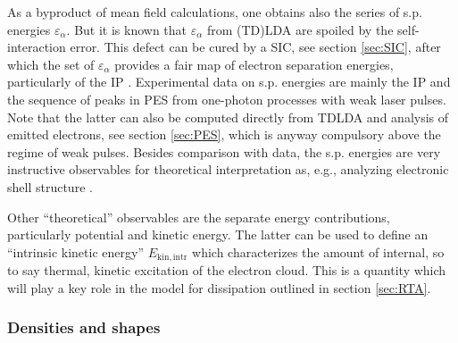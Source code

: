 \documentclass[final,1p]{elsarticle}
\begin{document}
As a byproduct of mean field calculations, one obtains also the series
of s.p. energies $\varepsilon_\alpha$.  But it is known that
$\varepsilon_\alpha$ from (TD)LDA are spoiled by the self-interaction
error. This defect can be cured by a SIC, see section \ref{sec:SIC},
after which the set of $\varepsilon_\alpha$ provides a fair map of
electron separation energies, particularly of the IP
\cite{Leg02,Klu13}. Experimental data on s.p. energies are mainly the
IP and the sequence of peaks in PES from one-photon processes with
weak laser pulses.  Note that the latter can also be computed directly
from TDLDA and analysis of emitted electrons, see section
\ref{sec:PES}, which is anyway compulsory above the regime of weak
pulses. Besides comparison with data, the s.p. energies are very
instructive observables for theoretical interpretation as, e.g.,
analyzing electronic shell structure \cite{Hee93,Bra93}.

Other ``theoretical'' observables are the separate energy
contributions, particularly potential and kinetic energy.  The latter
can be used to define an ``intrinsic kinetic energy''
$E_\mathrm{kin,intr}$ which characterizes the amount of internal, so
to say thermal, kinetic excitation of the electron cloud. This is a
quantity which will play a key role in the model for dissipation
outlined in section \ref{sec:RTA}.


\subsubsection{Densities and shapes}
\label{sec:shapes}
\end{document}
